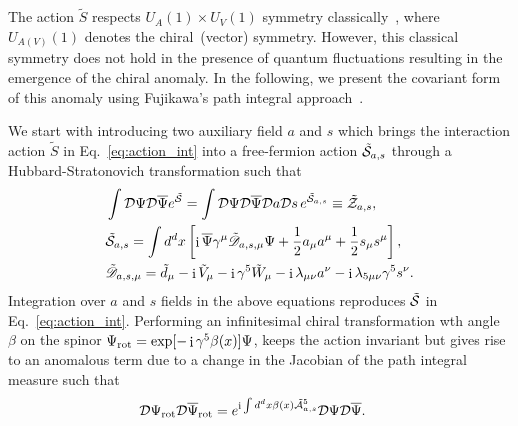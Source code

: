 \documentclass[prl,aps,showpacs,twocolumn,preprintnumbers,
amsmath,amssymb,superscriptaddress,longbibliography]{revtex4-1}
\renewcommand{\i}{\mathop{\mathrm{i}}}
\newcommand{\scr}[1]{\mathscr #1}
\begin{document}
The action $\tilde{S}$ respects $U_{A}(1) \times U_{V}(1)$ symmetry classically~\cite{Rylands2021, Parhizkar2023}, where $U_{A(V)}(1)$ denotes the chiral~(vector) symmetry. However, this classical symmetry does not hold in the presence of quantum fluctuations resulting in the emergence of the chiral anomaly. In the following, we present the covariant form of this anomaly using Fujikawa's path integral approach~\cite{Fujikawa1979, Fujikawa1980, Fujikawa1981, Bertlmann1996, Fujikawa2004}.


We start with introducing two auxiliary field $a$ and $s$ which brings the interaction action $\tilde{S}$ in Eq.~\eqref{eq:action_int} into a free-fermion action $\tilde{\cal S}_{a,s}$ through a Hubbard-Stratonovich transformation such that
\begin{align}
   & \int {\cal D}\Psi {\cal D}\overline{\Psi} e^{\tilde{\cal S}}
    =
    \int {\cal D}\Psi {\cal D}\overline{\Psi}{\cal D}a {\cal D}s \, e^{\tilde{\cal S}_{a,s}} \equiv \tilde{\cal Z}_{a,s}
    \label{eq:Z_as}
    ,
    \\
   & \tilde{\cal S}_{a,s} =  \int d^{d} x \left[
    \i \overline{\Psi} \gamma^{\mu} \tilde{\scr{ D}}_{a,s,\mu} \Psi
    + \frac{1}{2} a_{\mu}a^{\mu}  + \frac{1}{2} s_{\mu}s^{\mu} 
    \right]
    \label{eq:S_as}
    ,\\
    & \tilde{\scr{ D}}_{a,s,\mu} =  \tilde{d}_{\mu} -\i \tilde{V}_{\mu} - \i \gamma^{5} \tilde{W}_{\mu}  -\i {\lambda}_{\mu \nu} a^{\nu}-\i {\lambda}_{5 \mu \nu} \gamma^{5} s^{\nu} .
\end{align}
Integration over $a$ and $s$ fields in the above equations reproduces $\tilde{\cal S}$ in Eq.~\eqref{eq:action_int}. Performing an infinitesimal chiral transformation wth angle $\beta$ on the spinor $\Psi_{\rm rot}=\exp[-\i \gamma^{5} \beta(x)] \Psi$, keeps the action invariant but gives rise to an anomalous term due to a change in the Jacobian of the path integral measure such that
\begin{align}
    &{\cal D} \Psi_{\rm rot} {\cal D} \overline{\Psi}_{\rm rot}
    =e^{\i \int d^{d} x \beta(x) \tilde{{\cal A}}_{a,s}^{5}}
    {\cal D} \Psi {\cal D} \overline{\Psi}.
    \label{eq:S5A5}
\end{align}
\end{document}
